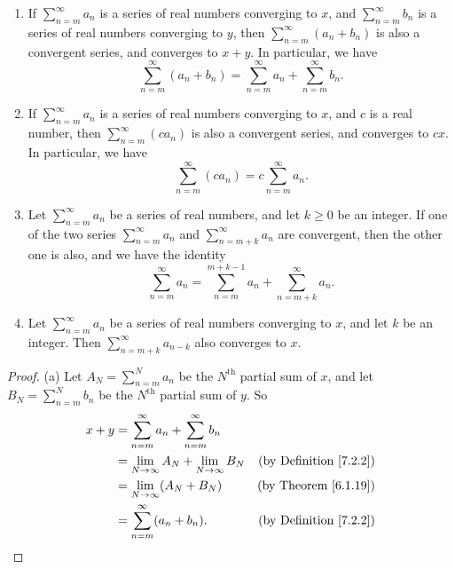 \setcounter{theorem}{13}
\begin{proposition}\label{6.2.14}
    \mbox{}
    \begin{enumerate}
        \item If \(\sum_{n = m}^\infty a_n\) is a series of real numbers converging to \(x\), and \(\sum_{n = m}^\infty b_n\) is a series of real numbers converging to \(y\), then \(\sum_{n = m}^\infty (a_n + b_n)\) is also a convergent series, and converges to \(x + y\).
        In particular, we have
        \[
            \sum_{n = m}^\infty (a_n + b_n) = \sum_{n = m}^\infty a_n + \sum_{n = m}^\infty b_n.
        \]
        \item If \(\sum_{n = m}^\infty a_n\) is a series of real numbers converging to \(x\), and \(c\) is a real number, then \(\sum_{n = m}^\infty (c a_n)\) is also a convergent series, and converges to \(cx\).
        In particular, we have
        \[
            \sum_{n = m}^\infty (c a_n) = c \sum_{n = m}^\infty a_n.
        \]
        \item Let \(\sum_{n = m}^\infty a_n\) be a series of real numbers, and let \(k \geq 0\) be an integer.
        If one of the two series \(\sum_{n = m}^\infty a_n\) and \(\sum_{n = m + k}^\infty a_n\) are convergent, then the other one is also, and we have the identity
        \[
            \sum_{n = m}^\infty a_n = \sum_{n = m}^{m + k - 1} a_n + \sum_{n = m + k}^\infty a_n.
        \]
        \item Let \(\sum_{n = m}^\infty a_n\) be a series of real numbers converging to \(x\), and let \(k\) be an integer.
        Then \(\sum_{n = m + k}^\infty a_{n - k}\) also converges to \(x\).
    \end{enumerate}
\end{proposition}

\begin{proof}{(a)}
Let \(A_N = \sum_{n = m}^N a_n\) be the \(N^{\text{th}}\) partial sum of \(x\), and let \(B_N = \sum_{n = m}^N b_n\) be the \(N^{\text{th}}\) partial sum of \(y\).
So
\begin{align*}
x + y &= \sum_{n = m}^\infty a_n + \sum_{n = m}^\infty b_n \\
&= \lim_{N \to \infty} A_N + \lim_{N \to \infty} B_N & \text{(by Definition \ref{7.2.2})} \\
&= \lim_{N \to \infty} (A_N + B_N) & \text{(by Theorem \ref{6.1.19})} \\
&= \sum_{n = m}^\infty (a_n + b_n). & \text{(by Definition \ref{7.2.2})}
\end{align*}
\end{proof}

